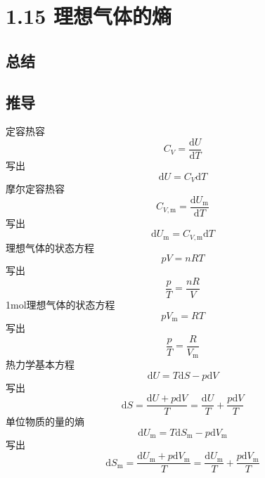 \section{1.15 理想气体的熵}


\subsection{总结}





\newpage
\subsection{推导}
定容热容
\begin{equation}
    C_V=\frac{\mathrm{d}U}{\mathrm{d}T}
\end{equation}
写出
\begin{equation}
    \mathrm{d}U=C_V\mathrm{d}T
\end{equation}
摩尔定容热容
\begin{equation}
    C_{V,\mathrm{m}}=\frac{\mathrm{d}U_{\mathrm{m}}}{\mathrm{d}T}
\end{equation}
写出
\begin{equation}
    \mathrm{d}U_{\mathrm{m}}=C_{V,\mathrm{m}}\mathrm{d}T
\end{equation}
理想气体的状态方程
\begin{equation}
    pV=nRT
\end{equation}
写出
\begin{equation}
    \frac{p}{T}=\frac{nR}{V}
\end{equation}
1mol理想气体的状态方程
\begin{equation}
    pV_{\mathrm{m}}=RT
\end{equation}
写出
\begin{equation}
    \frac{p}{T}=\frac{R}{V_{\mathrm{m}}}
\end{equation}
热力学基本方程
\begin{equation}
    \mathrm{d}U=T\mathrm{d}S-p\mathrm{d}V
\end{equation}
写出
\begin{equation}
    \mathrm{d}S=\frac{\mathrm{d}U+p\mathrm{d}V}{T}=\frac{\mathrm{d}U}{T}+\frac{p\mathrm{d}V}{T}
\end{equation}
单位物质的量的熵
\begin{equation}
    \mathrm{d}U_{\mathrm{m}}=T\mathrm{d}S_{\mathrm{m}}-p\mathrm{d}V_{\mathrm{m}}
\end{equation}
写出
\begin{equation}
    \mathrm{d}S_{\mathrm{m}}=\frac{\mathrm{d}U_{\mathrm{m}}+p\mathrm{d}V_{\mathrm{m}}}{T}=\frac{\mathrm{d}U_{\mathrm{m}}}{T}+\frac{p\mathrm{d}V_{\mathrm{m}}}{T}
\end{equation}
